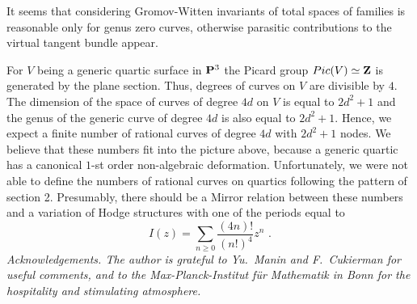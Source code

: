 \documentclass{amsart}
\begin{document}
It seems that considering Gromov-Witten invariants of total spaces of families
is reasonable only for genus zero curves, otherwise parasitic contributions to
the virtual tangent bundle appear.


For $V$ being a generic quartic surface in $\P^3$ the Picard group
$Pic(V)\simeq \Z$ is generated by the plane section. Thus, degrees of curves on
$V$ are divisible by $4$. The dimension of the space of curves of degree $4d$
on $V$ is equal to $2d^2+1$ and the genus of the generic  curve of degree $4d$
is also equal to $2d^2+1$. Hence, we expect
 a finite number of rational curves of degree $4d$ with
  $2d^2+1$ nodes.
We believe that these numbers fit into the picture above, because a generic
quartic has a canonical $1$-st order non-algebraic deformation.
  Unfortunately, we were not able to define the numbers of rational curves on
quartics following the pattern of section 2. Presumably,
 there should be a Mirror relation between these numbers and a variation of
Hodge structures with one of the periods equal to
$$I(z)=\sum_{n\ge 0} \frac{(4n)!}{(n!)^4}z^n\,\,.$$
\newline
\newline
\it Acknowledgements\rm. The author is grateful to Yu.~Manin and F.~Cukierman
for useful comments, and to the Max-Planck-Institut
 f\"ur Mathematik in Bonn for the hospitality and stimulating atmosphere.
\end{document}

